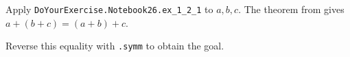 Apply \texttt{DoYourExercise.Notebook26.ex_1_2_1} to $a,b,c$. The theorem from  gives $a+(b+c)=(a+b)+c$.

Reverse this equality with \texttt{.symm} to obtain the goal.
